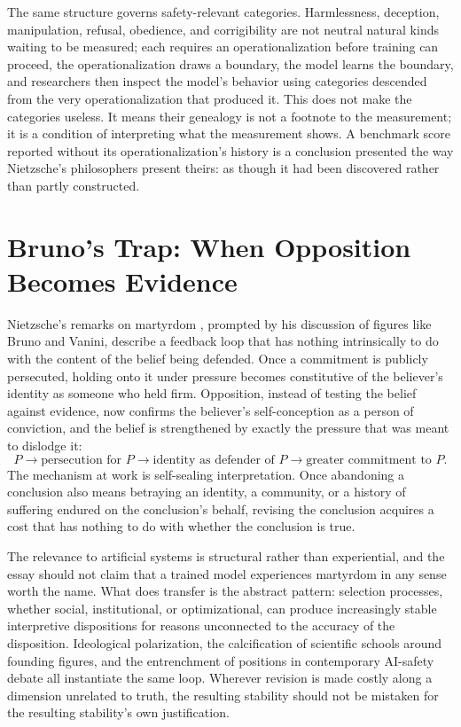 \documentclass[11pt]{article}
\begin{document}
The same structure governs safety-relevant categories. Harmlessness, deception, manipulation, refusal, obedience, and corrigibility are not neutral natural kinds waiting to be measured; each requires an operationalization before training can proceed, the operationalization draws a boundary, the model learns the boundary, and researchers then inspect the model's behavior using categories descended from the very operationalization that produced it. This does not make the categories useless. It means their genealogy is not a footnote to the measurement; it is a condition of interpreting what the measurement shows. A benchmark score reported without its operationalization's history is a conclusion presented the way Nietzsche's philosophers present theirs: as though it had been discovered rather than partly constructed.

\section{Bruno's Trap: When Opposition Becomes Evidence}

Nietzsche's remarks on martyrdom \cite[\S 25]{nietzsche1886}, prompted by his discussion of figures like Bruno and Vanini, describe a feedback loop that has nothing intrinsically to do with the content of the belief being defended. Once a commitment is publicly persecuted, holding onto it under pressure becomes constitutive of the believer's identity as someone who held firm. Opposition, instead of testing the belief against evidence, now confirms the believer's self-conception as a person of conviction, and the belief is strengthened by exactly the pressure that was meant to dislodge it:
\[
P \rightarrow \text{persecution for } P \rightarrow \text{identity as defender of } P \rightarrow \text{greater commitment to } P.
\]
The mechanism at work is self-sealing interpretation. Once abandoning a conclusion also means betraying an identity, a community, or a history of suffering endured on the conclusion's behalf, revising the conclusion acquires a cost that has nothing to do with whether the conclusion is true.

The relevance to artificial systems is structural rather than experiential, and the essay should not claim that a trained model experiences martyrdom in any sense worth the name. What does transfer is the abstract pattern: selection processes, whether social, institutional, or optimizational, can produce increasingly stable interpretive dispositions for reasons unconnected to the accuracy of the disposition. Ideological polarization, the calcification of scientific schools around founding figures, and the entrenchment of positions in contemporary AI-safety debate all instantiate the same loop. Wherever revision is made costly along a dimension unrelated to truth, the resulting stability should not be mistaken for the resulting stability's own justification.
\end{document}
